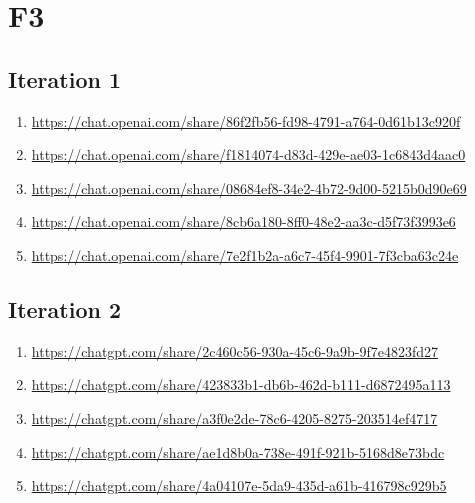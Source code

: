 \section{F3\label{F3-1}}

\subsection{Iteration 1}

\begin{enumerate}
    \item \href{https://chat.openai.com/share/86f2fb56-fd98-4791-a764-0d61b13c920f}{https://chat.openai.com/share/86f2fb56-fd98-4791-a764-0d61b13c920f}
    \item \href{https://chat.openai.com/share/f1814074-d83d-429e-ae03-1c6843d4aac0}{https://chat.openai.com/share/f1814074-d83d-429e-ae03-1c6843d4aac0}
    \item \href{https://chat.openai.com/share/08684ef8-34e2-4b72-9d00-5215b0d90e69}{https://chat.openai.com/share/08684ef8-34e2-4b72-9d00-5215b0d90e69}
    \item \href{https://chat.openai.com/share/8cb6a180-8ff0-48e2-aa3c-d5f73f3993e6}{https://chat.openai.com/share/8cb6a180-8ff0-48e2-aa3c-d5f73f3993e6}
    \item \href{https://chat.openai.com/share/7e2f1b2a-a6c7-45f4-9901-7f3cba63c24e}{https://chat.openai.com/share/7e2f1b2a-a6c7-45f4-9901-7f3cba63c24e}
\end{enumerate}

\subsection{Iteration 2}

\begin{enumerate}
    \item \href{https://chatgpt.com/share/2c460c56-930a-45c6-9a9b-9f7e4823fd27}{https://chatgpt.com/share/2c460c56-930a-45c6-9a9b-9f7e4823fd27}
    \item \href{https://chatgpt.com/share/423833b1-db6b-462d-b111-d6872495a113}{https://chatgpt.com/share/423833b1-db6b-462d-b111-d6872495a113}
    \item \href{https://chatgpt.com/share/a3f0e2de-78c6-4205-8275-203514ef4717}{https://chatgpt.com/share/a3f0e2de-78c6-4205-8275-203514ef4717}
    \item \href{https://chatgpt.com/share/ae1d8b0a-738e-491f-921b-5168d8e73bdc}{https://chatgpt.com/share/ae1d8b0a-738e-491f-921b-5168d8e73bdc}
    \item \href{https://chatgpt.com/share/4a04107e-5da9-435d-a61b-416798c929b5}{https://chatgpt.com/share/4a04107e-5da9-435d-a61b-416798c929b5}
\end{enumerate}


